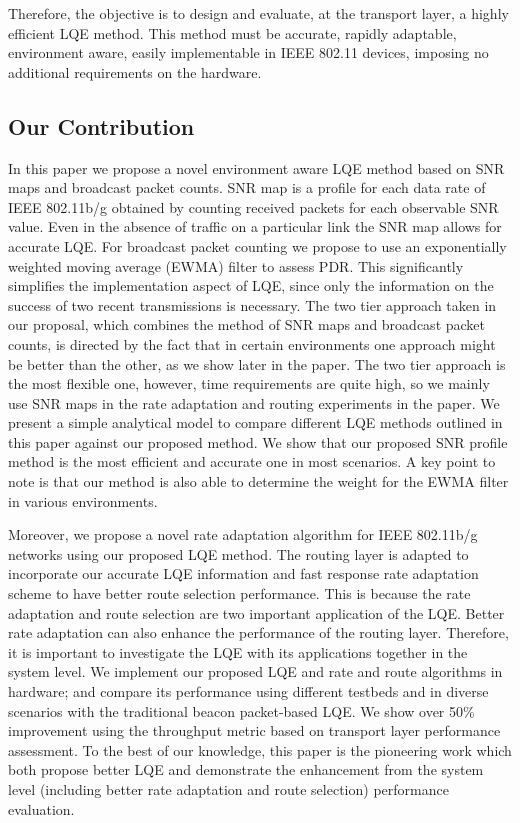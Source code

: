 \documentclass[11pt,draftclsnofoot,journal,onecolumn]{IEEEtran}
\begin{document}
Therefore, the objective is to design and evaluate, at the transport layer, a highly efficient LQE method. This method must be accurate, rapidly adaptable, environment aware, easily implementable in IEEE 802.11 devices, imposing no additional requirements on the hardware.

\subsection{Our Contribution}
\label{sec:contribution}

In this paper we propose a novel environment aware LQE method based on SNR maps and broadcast packet counts. SNR map is a profile for each data rate of IEEE 802.11b/g obtained by counting received packets for each observable SNR value. Even in the absence of traffic on a particular link the SNR map allows for accurate LQE. For broadcast packet counting we propose to use an exponentially weighted moving average (EWMA) filter to assess PDR. This significantly simplifies the implementation aspect of LQE, since only the information on the success of two recent transmissions is necessary. The two tier approach taken in our proposal, which combines the method of SNR maps and broadcast packet counts, is directed by the fact that in certain environments one approach might be better than the other, as we show later in the paper. The two tier approach is the most flexible one, however, time requirements are quite high, so we mainly use SNR maps in the rate adaptation and routing experiments in the paper. We present a simple analytical model to compare different LQE methods outlined in this paper against our proposed method. We show that our proposed SNR profile method is the most efficient and accurate one in most scenarios. A key point to note is that our method is also able to determine the weight for the EWMA filter in various environments.

Moreover, we propose a novel rate adaptation algorithm for IEEE 802.11b/g networks using our proposed LQE method. The routing layer is adapted to incorporate our accurate LQE information and fast response rate adaptation scheme to have better route selection performance. This is because the rate adaptation and route selection are two important application of the LQE. Better rate adaptation can also enhance the performance of the routing layer. Therefore, it is important to investigate the LQE with its applications together in the system level. We implement our proposed LQE and rate and route algorithms in hardware; and compare its performance using different testbeds and in diverse scenarios with the traditional beacon packet-based LQE. We show over 50\% improvement using the throughput metric based on transport layer performance assessment. To the best of our knowledge, this paper is the pioneering work which both propose better LQE and demonstrate the enhancement from the system level (including better rate adaptation and route selection) performance evaluation.
\end{document}
